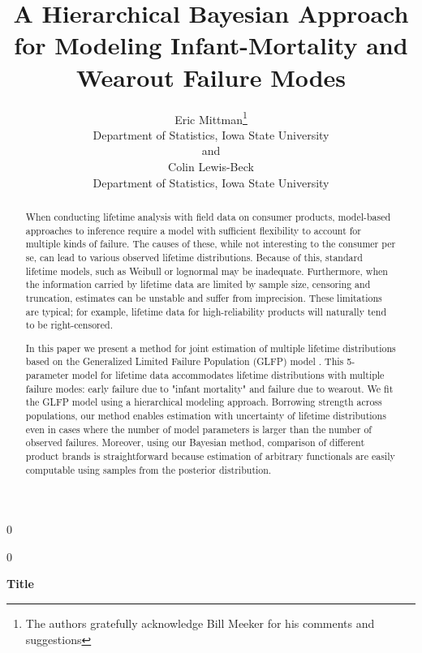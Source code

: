 \documentclass[12pt]{article}
\newcommand{\blind}{0}
\begin{document}
\def\spacingset#1{\renewcommand{\baselinestretch}%
{#1}\small\normalsize} \spacingset{1}



\blind
{
  \title{\bf A Hierarchical Bayesian Approach for Modeling Infant-Mortality and Wearout Failure Modes}
  \author{Eric Mittman\thanks{
    The authors gratefully acknowledge Bill Meeker for his comments and suggestions}\hspace{.2cm}\\
    Department of Statistics, Iowa State University\\
    and \\
    Colin Lewis-Beck \\
    Department of Statistics, Iowa State University}
  \maketitle
} \fi

\blind
{
  \bigskip
  \bigskip
  \bigskip
  \begin{center}
    {\LARGE\bf Title}
\end{center}
  \medskip
} \fi

\bigskip
\begin{abstract}
When conducting lifetime analysis with field data on consumer products, model-based approaches to inference require a model with sufficient flexibility to account for multiple kinds of failure. The causes of these, while not interesting to the consumer per se, can lead to various observed lifetime distributions. Because of this, standard lifetime models, such as Weibull or lognormal may be inadequate. 
Furthermore, when the information carried by lifetime data are limited by sample size, censoring and truncation, estimates can be unstable and suffer from imprecision. These limitations are typical; for example, lifetime data for high-reliability products will naturally tend to be right-censored.


In this paper we present a method for joint estimation of multiple lifetime distributions based on the Generalized Limited Failure Population (GLFP) model \citep{chan}. This 5-parameter model for lifetime data accommodates lifetime distributions with multiple failure modes:  early failure due to "infant mortality" and failure due to wearout. We fit the GLFP model using a hierarchical modeling approach.  Borrowing strength across populations, our method enables estimation with uncertainty of lifetime distributions even in cases where the number of model parameters is larger than the number of observed failures.  Moreover, using our Bayesian method, comparison of different product brands is straightforward because estimation of arbitrary functionals are easily computable using samples from the posterior distribution.
\end{abstract}
\end{document}
